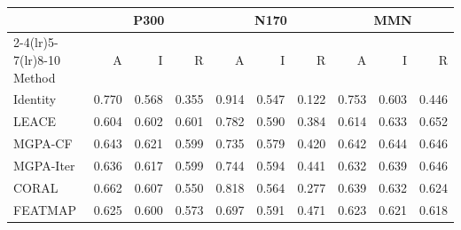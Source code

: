 \begingroup\small\setlength{\tabcolsep}{4pt}
\begin{tabular*}{\textwidth}{@{\extracolsep{\fill}}lrrrrrrrrr@{}}
\toprule
 & \multicolumn{3}{c}{P300} & \multicolumn{3}{c}{N170} & \multicolumn{3}{c}{MMN} \\
\cmidrule(lr){2-4}\cmidrule(lr){5-7}\cmidrule(lr){8-10}
Method & A & I & R & A & I & R & A & I & R \\
\midrule
Identity & 0.770 & 0.568 & 0.355 & 0.914 & 0.547 & 0.122 & 0.753 & 0.603 & 0.446 \\
LEACE & 0.604 & 0.602 & 0.601 & 0.782 & 0.590 & 0.384 & 0.614 & 0.633 & 0.652 \\
MGPA-CF & 0.643 & 0.621 & 0.599 & 0.735 & 0.579 & 0.420 & 0.642 & 0.644 & 0.646 \\
MGPA-Iter & 0.636 & 0.617 & 0.599 & 0.744 & 0.594 & 0.441 & 0.632 & 0.639 & 0.646 \\
CORAL & 0.662 & 0.607 & 0.550 & 0.818 & 0.564 & 0.277 & 0.639 & 0.632 & 0.624 \\
FEATMAP & 0.625 & 0.600 & 0.573 & 0.697 & 0.591 & 0.471 & 0.623 & 0.621 & 0.618 \\
\bottomrule
\end{tabular*}\endgroup
